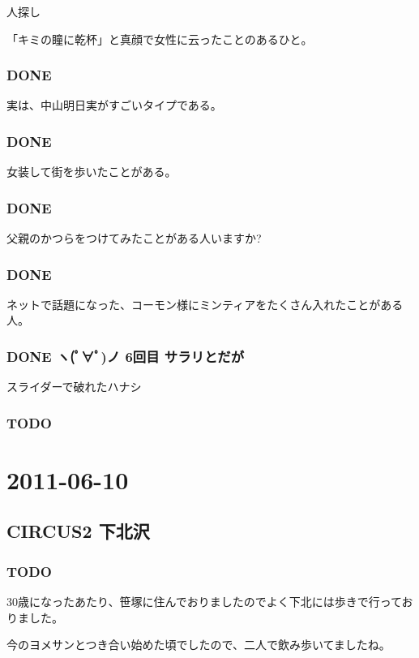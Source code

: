 \documentclass[11pt]{article}
\begin{document}
人探し

「キミの瞳に乾杯」と真顔で女性に云ったことのあるひと。
\subsubsection{\textbf{DONE}}
\label{sec-109_3_2}

実は、中山明日実がすごいタイプである。
\subsubsection{\textbf{DONE}}
\label{sec-109_3_3}

女装して街を歩いたことがある。
\subsubsection{\textbf{DONE}}
\label{sec-109_3_4}

父親のかつらをつけてみたことがある人いますか?
\subsubsection{\textbf{DONE}}
\label{sec-109_3_5}

ネットで話題になった、コーモン様にミンティアをたくさん入れたことがある人。
\subsubsection{\textbf{DONE} ヽ(ﾟ∀ﾟ)ノ 6回目 サラリとだが}
\label{sec-109_3_6}

スライダーで破れたハナシ
\subsubsection{\textbf{TODO}}
\label{sec-109_3_7}
\section{2011-06-10}
\label{sec-110}
\subsection{CIRCUS2 下北沢}
\label{sec-110_1}
\subsubsection{\textbf{TODO}}
\label{sec-110_1_1}

30歳になったあたり、笹塚に住んでおりましたのでよく下北には歩きで行っておりました。

今のヨメサンとつき合い始めた頃でしたので、二人で飲み歩いてましたね。
\end{document}

